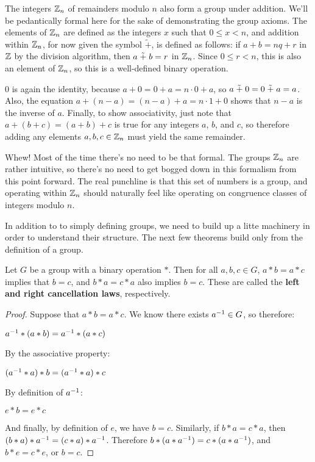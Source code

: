 \begin{example}
The integers $\zn[n]$ of remainders modulo $n$ also form a group under addition. We'll be pedantically formal here for the sake of demonstrating the group axioms. The elements of $\zn[n]$ are defined as the integers $x$ such that $0 \leq x < n$, and addition within $\zn[n]$, for now given the symbol $\tilde +$, is defined as follows: if $a + b = nq + r$ in $\z$ by the division algorithm, then $a \np b = r$ in $\zn[n]$. Since $0 \leq r < n$, this is also an element of $\zn[n]$, so this is a well-defined binary operation.

$0$ is again the identity, because $a + 0 = 0 + a = n\cdot 0 + a$, so $a \np 0 = 0 \np a = a$. Also, the equation $a + (n-a) = (n-a) + a = n\cdot 1 + 0$ shows that $n-a$ is the inverse of $a$. Finally, to show associativity, just note that $a + (b + c) = (a + b) + c$ is true for any integers $a$, $b$, and $c$, so therefore adding any elements $a, b, c \in \zn[n]$ must yield the same remainder.
\end{example}

Whew! Most of the time there's no need to be that formal. The groups $\zn[n]$ are rather intuitive, so there's no need to get bogged down in this formalism from this point forward. The real punchline is that this set of numbers is a group, and operating within $\zn[n]$ should naturally feel like operating on congruence classes of integers modulo $n$.

In addition to to simply defining groups, we need to build up a litte machinery in order to understand their structure. The next few theorems build only from the definition of a group.

\begin{theorem}
Let $G$ be a group with a binary operation $*$. Then for all $a, b, c \in G$, $a * b = a * c$ implies that $b = c$, and $b*a = c*a$ also implies $b=c$. These are called the \textbf{left and right cancellation laws}, respectively.
\end{theorem}

\begin{proof}
Suppose that $a*b = a*c$. We know there exists $\inv{a} \in G$, so therefore:

\begin{center}
    $\inv{a} * (a*b) = \inv{a} * (a*c)$
\end{center}

By the associative property:

\begin{center}
    $(\inv{a} * a) * b = (\inv{a} * a) * c$
\end{center}

By definition of $\inv{a}$:

\begin{center}
    $e * b = e * c$
\end{center}

And finally, by definition of $e$, we have $b = c$. Similarly, if $b*a = c*a$, then $(b*a)*\inv{a} = (c*a)*\inv{a}$. Therefore $b*(a*\inv{a}) = c*(a*\inv{a})$, and $b*e = c*e$, or $b = c$.

\end{proof}

